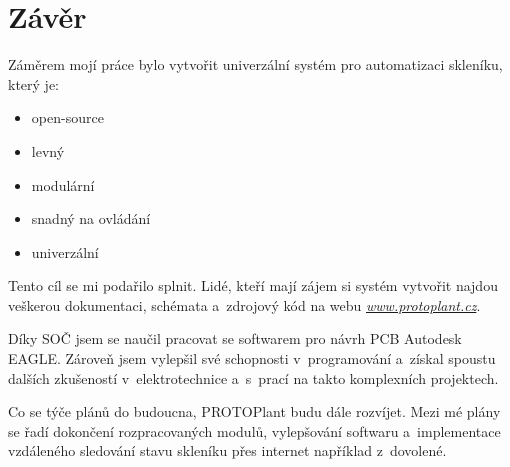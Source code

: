 \chapter*{Závěr}

Záměrem mojí práce bylo vytvořit univerzální systém pro automatizaci skle\-ní\-ku, který je:
\begin{itemize}
    \item open-source
    \item levný
    \item modulární
    \item snadný na ovládání
    \item univerzální
\end{itemize}

Tento cíl se mi podařilo splnit.
Lidé, kteří mají zájem si systém vytvořit najdou veškerou dokumentaci, schémata a~zdrojový kód na webu \textit{\url{www.protoplant.cz}}.

Díky SOČ jsem se naučil pracovat se softwarem pro návrh PCB Autodesk EAGLE.
Zároveň jsem vylepšil své schopnosti v~programování a~získal spoustu dalších zkušeností v~elektrotechnice a~s~prací na takto komplexních projektech.

Co se týče plánů do budoucna, PROTOPlant budu dále rozvíjet.
Mezi mé plány se řadí dokončení rozpracovaných modulů, vylepšování softwaru a~implementace vzdáleného sledování stavu skleníku přes internet například z~dovolené.

\fxnote[author=PŠ]{\textcolor{mygreen}{Přidat kecy o~prodeji PROTOPlantu}}

\newpage